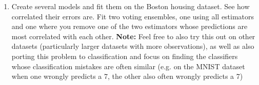 \documentclass[USenglish,final,authoryear,12pt]{article}
\begin{document}
\begin{enumerate}
	\item Create several models and fit them on the Boston housing dataset. See how correlated their errors are. Fit two voting ensembles, one using all estimators and one where you remove one of the two estimators whose predictions are most correlated with each other.\newline\linebreak
	\textbf{Note:} Feel free to also try this out on other datasets (particularly larger datasets with more observations), as well as also porting this problem to classification and focus on finding the classifiers whose classification mistakes are often similar (e.g. on the MNIST dataset when one wrongly predicts a 7, the other also often wrongly predicts a 7)
\end{enumerate}
\end{document}
